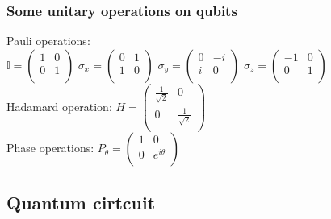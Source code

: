 \documentclass[5pt]{article}
\begin{document}
\begin{multicols}{3}
\subsubsection{Some unitary operations on qubits}
Pauli operations:\\
$\mathbb{I}=\begin{pmatrix}
     1 & 0 \\
     0 & 1 \\
\end{pmatrix}$ 
$\sigma_x =\begin{pmatrix}
     0 & 1 \\
     1 & 0 \\
\end{pmatrix}$
$\sigma_y =\begin{pmatrix}
     0 & -i \\
     i & 0 \\
\end{pmatrix}$
$\sigma_z =\begin{pmatrix}
    -1 & 0 \\
     0 & 1 \\
\end{pmatrix}$ \\
Hadamard operation: 
$H =\begin{pmatrix}
     \frac{1}{\sqrt{2}} & 0 \\
     0 & \frac{1}{\sqrt{2}} \\
\end{pmatrix}$ \\
Phase operations:
$P_\theta =\begin{pmatrix}
     1 & 0 \\
     0 & e^{i\theta} \\
\end{pmatrix}$ \\



\subsection{Quantum cirtcuit}

\end{multicols}
\end{document}
